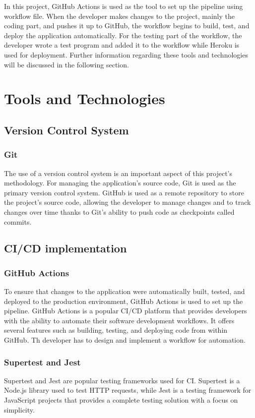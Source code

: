 In this project, GitHub Actions is used as the tool to set up the pipeline using workflow file. When the developer makes changes to the project, mainly the coding part, and pushes it up to GitHub, the workflow begins to build, test, and deploy the application automatically. For the testing part of the workflow, the developer wrote a test program and added it to the workflow while Heroku is used for deployment. Further information regarding these tools and technologies will be discussed in the following section.

\section{Tools and Technologies}
\subsection{Version Control System}
\subsubsection{Git}
The use of a version control system is an important aspect of this project's methodology. For managing the application's source code, Git is used as the primary version control system. GitHub is used as a remote repository to store the project's source code, allowing the developer to manage changes and to track changes over time thanks to Git's ability to push code as checkpoints called commits.

\subsection{CI/CD implementation}
\subsubsection{GitHub Actions}
To ensure that changes to the application were automatically built, tested, and deployed to the production environment, GitHub Actions is used to set up the pipeline. GitHub Actions is a popular CI/CD platform that provides developers with the ability to automate their software development workflows. It offers several features such as building, testing, and deploying code from within GitHub. Th developer has to design and implement a workflow for automation.

\subsubsection{Supertest and Jest}
Supertest and Jest are popular testing frameworks used for CI. Supertest is a Node.js library used to test HTTP requests, while Jest is a testing framework for JavaScript projects that provides a complete testing solution with a focus on simplicity.

